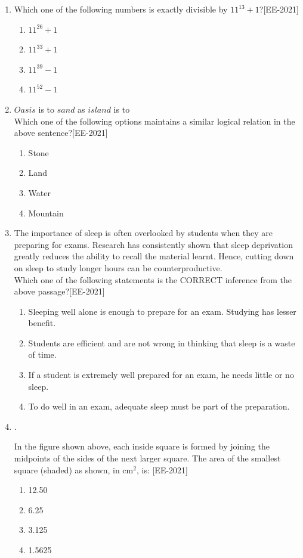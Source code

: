 \documentclass[journal]{IEEEtran}
\begin{document}
\begin{enumerate}
    \item Which one of the following numbers is exactly divisible by $11^{13} + 1$?\hfill{[EE-2021]}
    \begin{enumerate}
        \item $11^{26} + 1$
        \item $11^{33} + 1$
        \item $11^{39} - 1$
        \item $11^{52} - 1$
    \end{enumerate}
    
    \item $Oasis$ is to $sand$ as $island$ is to \underline{\hspace{2cm}}\\
    
    Which one of the following options maintains a similar logical relation in the above sentence?\hfill{[EE-2021]}
    \begin{enumerate}
        \item Stone
        \item Land
        \item Water
        \item Mountain
    \end{enumerate}
    \item The importance of sleep is often overlooked by students when they are preparing for exams. Research has consistently shown that sleep deprivation greatly reduces the ability to recall the material learnt. Hence, cutting down on sleep to study longer hours can be counterproductive.\\
    Which one of the following statements is the CORRECT inference from the above passage?\hfill{[EE-2021]}
    \begin{enumerate}
        \item Sleeping well alone is enough to prepare for an exam. Studying has lesser benefit.
        \item Students are efficient and are not wrong in thinking that sleep is a waste of time.
        \item If a student is extremely well prepared for an exam, he needs little or no sleep.
        \item To do well in an exam, adequate sleep must be part of the preparation.
    \end{enumerate}

    \item. \begin{figure}[H]
            \centering
    
    \end{figure}
    In the figure shown above, each inside square is formed by joining the midpoints of the sides of the next larger square. The area of the smallest square (shaded) as shown, in cm$^2$, is: \hfill{[EE-2021]}
    \begin{enumerate}
        \item 12.50
        \item 6.25
        \item 3.125
        \item 1.5625
    \end{enumerate}


\end{enumerate}
\end{document}
